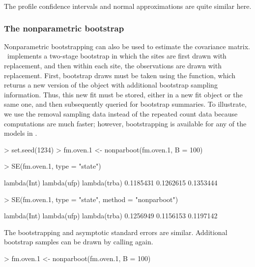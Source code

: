 \documentclass[article,shortnames]{jss}
\newcommand{\um}{\pkg{unmarked}}
\begin{document}
{The profile confidence intervals and normal approximations are quite
similar here.

\subsubsection{The nonparametric bootstrap}

Nonparametric bootstrapping can also be used to estimate the
covariance matrix. \um\ implements a two-stage bootstrap in which the
 sites are first drawn with replacement, and then within each site, the
observations are drawn with replacement.  First, bootstrap draws must
be taken using the  function, which returns a new
version of the  object with additional bootstrap sampling
information.  Thus, this new fit must be stored, either in a new fit
object or the same one, and then subsequently queried for bootstrap
summaries.  To illustrate, we use the removal sampling data instead of the
repeated count data because computations are much faster; however,
bootstrapping is available for any of the models in \um.

\begin{Schunk}
\begin{Sinput}
> set.seed(1234)
> fm.oven.1 <- nonparboot(fm.oven.1, B = 100)
\end{Sinput}
\end{Schunk}

\begin{Schunk}
\begin{Sinput}
> SE(fm.oven.1, type = "state")
\end{Sinput}
\begin{Soutput}
 lambda(Int)  lambda(ufp) lambda(trba) 
   0.1185431    0.1262615    0.1353444 
\end{Soutput}
\begin{Sinput}
> SE(fm.oven.1, type = "state", method = "nonparboot")
\end{Sinput}
\begin{Soutput}
 lambda(Int)  lambda(ufp) lambda(trba) 
   0.1256949    0.1156153    0.1197142 
\end{Soutput}
\end{Schunk}

The bootstrapping and asymptotic standard errors are similar. Additional
bootstrap samples can be drawn by calling  again.

\begin{Schunk}
\begin{Sinput}
> fm.oven.1 <- nonparboot(fm.oven.1, B = 100)
\end{Sinput}
\end{Schunk}



}
\end{document}
